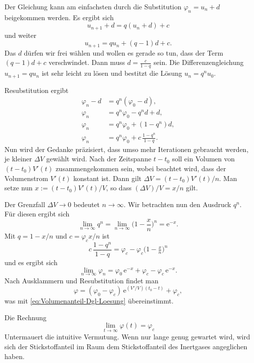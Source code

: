\documentclass[a4paper,10pt,fleqn,twocolumn,twoside,dvipdfmx]{scrartcl}
\numberwithin{equation}{section}
\newcommand{\ee}{\mathrm e}
\begin{document}
Der Gleichung kann am einfachsten durch die Substitution
$\varphi_n=u_n+d$ beigekommen werden. Es ergibt sich%
\begin{equation}
u_{n+1}+d = q(u_n+d)+c
\end{equation}
und weiter
\begin{equation}
u_{n+1} = qu_n+(q-1)d+c.
\end{equation}
Das $d$ dürfen wir frei wählen und wollen es gerade so tun,
dass der Term $(q-1)d+c$ verschwindet. Dann muss $d=\frac{c}{1-q}$
sein. Die Differenzengleichung $u_{n+1}=qu_n$ ist sehr leicht
zu lösen und bestitzt die Lösung $u_n = q^n u_0$.

Resubstitution ergibt
\begin{align}
\varphi_n-d &= q^n (\varphi_0-d),\\
\varphi_n &= q^n\varphi_0-q^n d+d,\\
\varphi_n &= q^n\varphi_0+(1-q^n)d,\\
\varphi_n &= q^n\varphi_0+c\,\frac{1-q^n}{1-q}.
\end{align}
Nun wird der Gedanke präzisiert, dass umso mehr Iterationen
gebraucht werden, je kleiner $\Delta V$ gewählt wird.
Nach der Zeitspanne $t-t_0$ soll ein Volumen von $(t-t_0)V'(t)$
zusammengekommen sein, wobei beachtet wird, dass der Volumenstrom
$V'(t)$ konstant ist. Dann gilt $\Delta V = (t-t_0)V'(t)/n$.
Man setze nun $x:=(t-t_0)V'(t)/V$, so dass $(\Delta V)/V=x/n$ gilt.
 
Der Grenzfall $\Delta V\to 0$ bedeutet $n\to\infty$.
Wir betrachten nun den Ausdruck $q^n$. Für diesen ergibt sich%
\begin{equation}
\lim_{n\to\infty} q^n = \lim_{n\to\infty} \Big(1-\frac{x}{n}\Big)^n
= \ee^{-x}.
\end{equation}
Mit $q=1-x/n$ und $c=\varphi_c x/n$ ist
\begin{equation}
c\,\frac{1-q^n}{1-q}
= \varphi_c -\varphi_c\big(1-\tfrac{x}{n}\big)^n
\end{equation}
und es ergibt sich
\begin{equation}
\lim_{n\to\infty}\varphi_n = \varphi_0\,\ee^{-x}+\varphi_c-\varphi_c\,\ee^{-x}.
\end{equation}
Nach Ausklammern und Resubstitution findet man%
\begin{equation}
\varphi = (\varphi_0-\varphi_c)\,\ee^{(V'/V)(t_0-t)}+\varphi_c,
\end{equation}
was mit \eqref{eq:Volumenanteil-Dgl-Loesung} übereinstimmt.

Die Rechnung
\begin{equation}
\lim_{t\to\infty}\varphi(t) = \varphi_c
\end{equation}
Untermauert die intuitive Vermutung. Wenn nur lange genug gewartet
wird, wird sich der Stickstoffanteil im Raum dem Stickstoffanteil des
Inertgases angeglichen haben.
\end{document}
